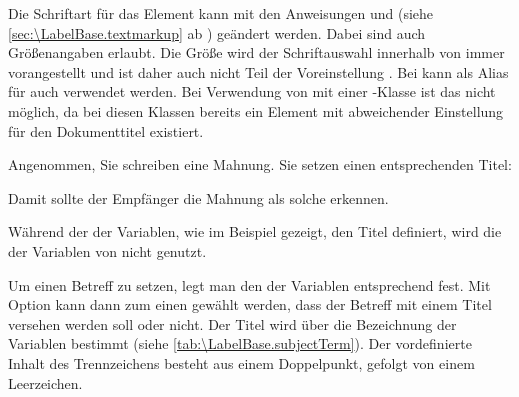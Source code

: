 %
%
Die Schriftart für das Element %
 kann mit den Anweisungen
 und
 (siehe
\autoref{sec:\LabelBase.textmarkup} ab
) geändert werden. Dabei sind auch
Größenangaben erlaubt. Die Größe  wird der Schriftauswahl
innerhalb von \KOMAScript{} immer vorangestellt und ist daher auch nicht
Teil der Voreinstellung
. Bei
 kann als Alias für
 auch
 verwendet werden. Bei
Verwendung von  mit einer \KOMAScript-Klasse ist das
nicht möglich, da bei diesen Klassen bereits ein Element
 mit abweichender Einstellung für den Dokumenttitel
existiert.%
%
%
\begin{Example}
  Angenommen, Sie schreiben eine Mahnung. Sie setzen einen
  entsprechenden Titel:
\begin{lstcode}
\end{lstcode}
  Damit sollte der Empfänger die Mahnung als solche erkennen.
\end{Example}
Während der  der Variablen, wie im Beispiel gezeigt, den Titel
definiert, wird die  der Variablen  von
\KOMAScript{} nicht genutzt.
%
\EndIndexGroup


\begin{Declaration}
\end{Declaration}
%
Um einen Betreff zu setzen, legt man den  der Variablen
 entsprechend fest. Mit Option
 kann
dann zum einen gewählt werden, dass der Betreff mit einem Titel versehen
werden soll oder nicht. Der Titel wird über die Bezeichnung der Variablen
 bestimmt (siehe \autoref{tab:\LabelBase.subjectTerm}).
Der vordefinierte Inhalt des
Trennzeichens  besteht aus
einem Doppelpunkt, gefolgt von einem Leerzeichen.

